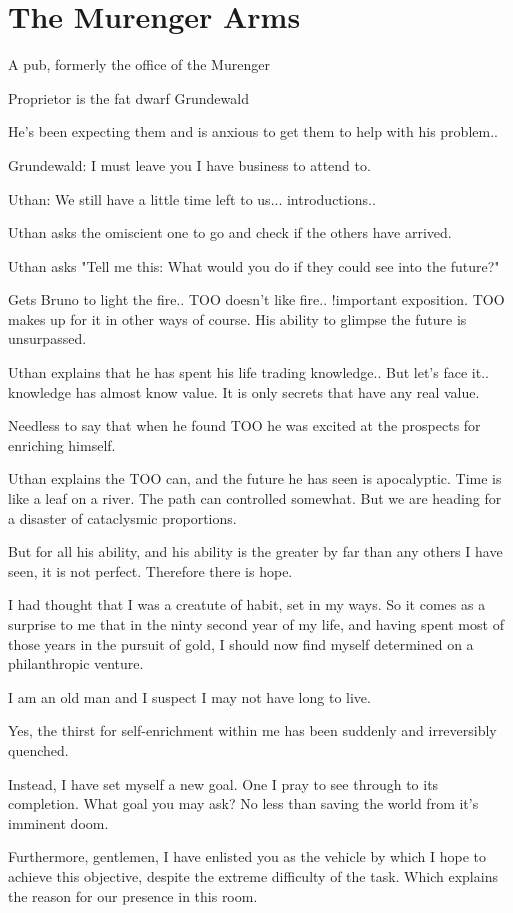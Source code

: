 \documentclass[a4paper]{dnd5}
\begin{document}
\section*{The Murenger Arms}

\begin{precis}
\item A pub, formerly the office of the Murenger
\item Proprietor is the fat dwarf Grundewald
\item He's been expecting them and is anxious to get them to help with his problem..
\item Grundewald: I must leave you I have business to attend to.
\item Uthan: We still have a little time left to us... introductions..
\item Uthan asks the omiscient one to go and check if the others have arrived.
\item Uthan asks "Tell me this: What would you do if they could see into the future?"
\item Gets Bruno to light the fire.. TOO doesn't like fire.. !important exposition.
TOO makes up for it in other ways of course.  His ability to glimpse the future is unsurpassed.
\item Uthan explains that he has spent his life trading knowledge.. But let's face it.. knowledge has almost know value.  It is only secrets that have any real value.
\item Needless to say that when he found TOO he was excited at the prospects for enriching himself.
\item Uthan explains the TOO can, and the future he has seen is apocalyptic.  
Time is like a leaf on a river.
The path can controlled somewhat.  
But we are heading for a disaster of cataclysmic proportions.
\item But for all his ability, and his ability is the greater by far than any others I have seen, it is not perfect.  Therefore there is hope.  
\item I had thought that I was a creatute of habit, set in my ways. So it comes as a surprise to me that in the ninty second year of my life, and having spent most of those years in the pursuit of gold, I should now find myself determined on a philanthropic venture.   
\item I am an old man and I suspect I may not have long to live.  
\item Yes, the thirst for self-enrichment within me has been suddenly and irreversibly quenched.
\item Instead, I have set myself a new goal.  One I pray to see through to its completion.  What goal you may ask?  No less than saving the world from it's imminent doom.
\item Furthermore, gentlemen, I have enlisted you as the vehicle by which I hope to achieve this objective, despite the extreme difficulty of the task.  Which explains the reason for our presence in this room.


\end{precis}
\end{document}
